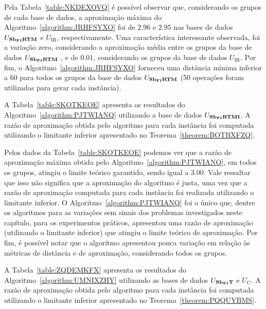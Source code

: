 

Pela Tabela~\ref{table:NKDEXOVQ} é possível observar que, considerando os grupos de cada base de dados, a aproximação máxima do Algoritmo~\ref{algorithm:JRHFSYXO} foi de $2.96$ e $2.95$ nas bases de dados $U_{\textbf{Sb\textsubscript{FI}RTM}}{}$ e $U_{\text{IR}}$, respectivamente. Uma característica interessante observada, foi a variação zero, considerando a aproximação média entre os grupos da base de dados $U_{\textbf{Sb\textsubscript{FI}RTM}}{}$ , e de $0.01$, considerando os grupos da base de dados $U_{\text{IR}}$. Por fim, o Algoritmo~\ref{algorithm:JRHFSYXO} forneceu uma distância mínima inferior a $60$ para todos os grupos da base de dados $U_{\textbf{Sb\textsubscript{FI}RTM}}{}$ (50 operações foram utilizadas para gerar cada instância).

A Tabela~\ref{table:SKOTKEOE} apresenta os resultados do Algoritmo~\ref{algorithm:PJTWIANQ} utilizando a base de dados $U_{\textbf{Sb\textsubscript{FI}RTMI}}{}$. A razão de aproximação obtida pelo algoritmo para cada instância foi computada utilizando o limitante inferior apresentado no Teorema~\ref{theorem:BOTBXFZQ}.



Pelos dados da Tabela~\ref{table:SKOTKEOE} podemos ver que a razão de aproximação máxima obtida pelo Algoritmo~\ref{algorithm:PJTWIANQ}, em todos os grupos, atingiu o limite teórico garantido, sendo igual a $3.00$. Vale ressaltar que isso não significa que a aproximação do algoritmo é justa, uma vez que a razão de aproximação computada para cada instância foi realizada utilizando o limitante inferior. O Algoritmo~\ref{algorithm:PJTWIANQ} foi o único que, dentre os algoritmos para as variações sem sinais dos problemas investigados neste capítulo, para os experimentos práticos, apresentou uma razão de aproximação (utilizando o limitante inferior) que atingiu o limite teórico de aproximação. Por fim, é possível notar que o algoritmo apresentou pouca variação em relação às métricas de distância e de aproximação, considerando todos os grupos.

A Tabela~\ref{table:ZQDEMKFX} apresenta os resultados do Algoritmo~\ref{algorithm:UMNIXZHY} utilizando as bases de dados $U_{\textbf{Sb\textsubscript{FI}T}}{}$ e $U_{\text{C}}$. A razão de aproximação obtida pelo algoritmo para cada instância foi computada utilizando o limitante inferior apresentado no Teorema~\ref{theorem:PQQUYBMS}.



